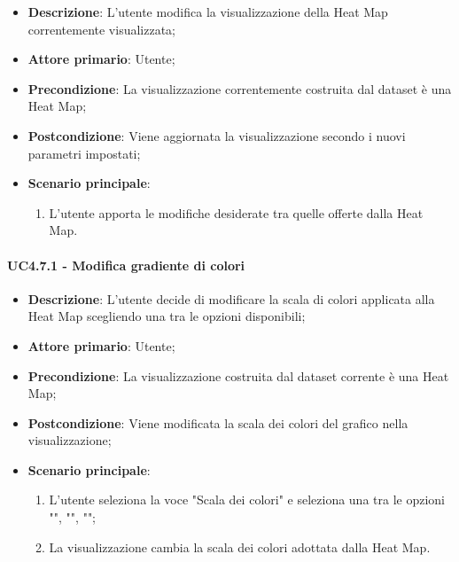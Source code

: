 \begin{itemize}
    \item \textbf{Descrizione}: L’utente modifica la visualizzazione della Heat Map correntemente visualizzata;

    \item \textbf{Attore primario}: Utente;

    \item \textbf{Precondizione}:   La visualizzazione correntemente costruita dal dataset è una Heat Map;

    \item \textbf{Postcondizione}:  Viene aggiornata la visualizzazione secondo i nuovi parametri impostati;

	\item \textbf{Scenario principale}:
		\begin{enumerate}
            \item L'utente apporta le modifiche desiderate tra quelle offerte dalla Heat Map.
        \end{enumerate}
\end{itemize}

\paragraph{UC4.7.1 - Modifica gradiente di colori}
\label{par:uc4.7.1}
\begin{itemize}
    \item \textbf{Descrizione}: L'utente decide di modificare la scala di colori applicata alla Heat Map scegliendo una tra le opzioni disponibili;

    \item \textbf{Attore primario}: Utente;

    \item \textbf{Precondizione}:   La visualizzazione costruita dal dataset corrente è una Heat Map;
    \item \textbf{Postcondizione}:  Viene modificata la scala dei colori del grafico nella visualizzazione;

	\item \textbf{Scenario principale}:
        \begin{enumerate}
            \item L'utente seleziona la voce "Scala dei colori" e seleziona una tra le opzioni  "", "", "";
            \item La visualizzazione cambia la scala dei colori adottata dalla Heat Map.
        \end{enumerate}
\end{itemize}

